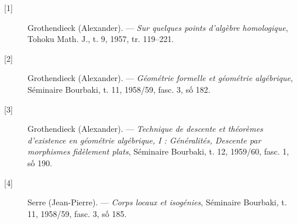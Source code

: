 \begin{description}
  \item[{[1]}] Grothendieck (Alexander). --- \emph{Sur quelques points
    d'algèbre homologique}, Tohoku Math. J., t. 9, 1957, tr. 119--221.
  \item[{[2]}] Grothendieck (Alexander). --- \emph{Géométrie formelle et
    géométrie algébrique}, Séminaire Bourbaki, t. 11, 1958/59, fasc. 3,
    số 182.
  \item[{[3]}] Grothendieck (Alexander). --- \emph{Technique de descente et
    théorèmes d'existence en géométrie algébrique, I : Généralités, Descente
    par morphismes fidèlement plats}, Séminaire Bourbaki, t. 12, 1959/60,
    fasc. 1, số 190.
  \item[{[4]}] Serre (Jean-Pierre). --- \emph{Corps locaux et isogénies},
    Séminaire Bourbaki, t. 11, 1958/59, fasc. 3, số 185.
\end{description}

\par

